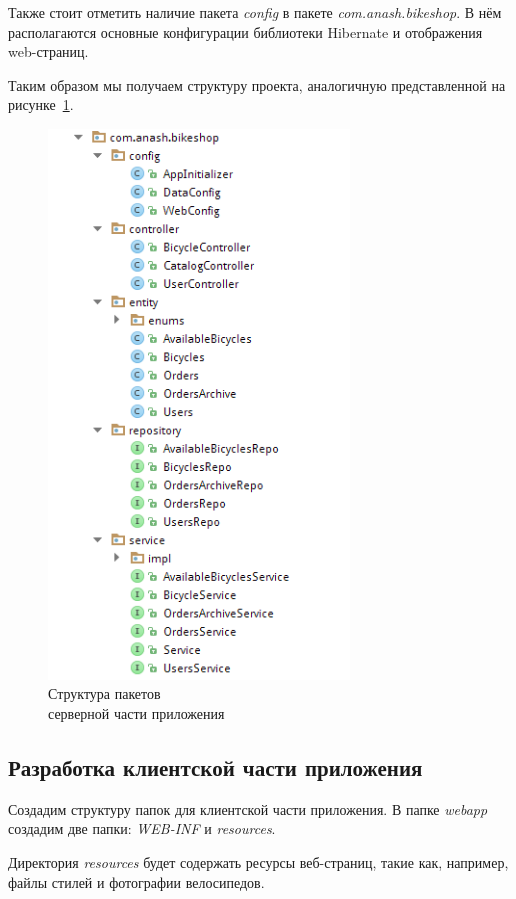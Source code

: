 Также стоит отметить наличие пакета \textit{config} в пакете \textit{com.anash.bikeshop}.
В нём располагаются основные конфигурации библиотеки Hibernate и отображения web-страниц.

Таким образом мы получаем структуру проекта, аналогичную представленной
на рисунке~\ref{fig:project_structure}.

\begin{figure}[h]
  \centering
  \includegraphics[width=80mm]{pic/project_structure.png}
  \caption{Структура пакетов \\ серверной части приложения}
  \label{fig:project_structure}
\end{figure}

\subsection{Разработка клиентской части приложения}

Создадим структуру папок для клиентской части приложения. В папке \textit{webapp}
создадим две папки: \textit{WEB-INF} и \textit{resources}.

Директория \textit{resources} будет содержать ресурсы веб-страниц,
такие как, например, файлы стилей и фотографии велосипедов.


